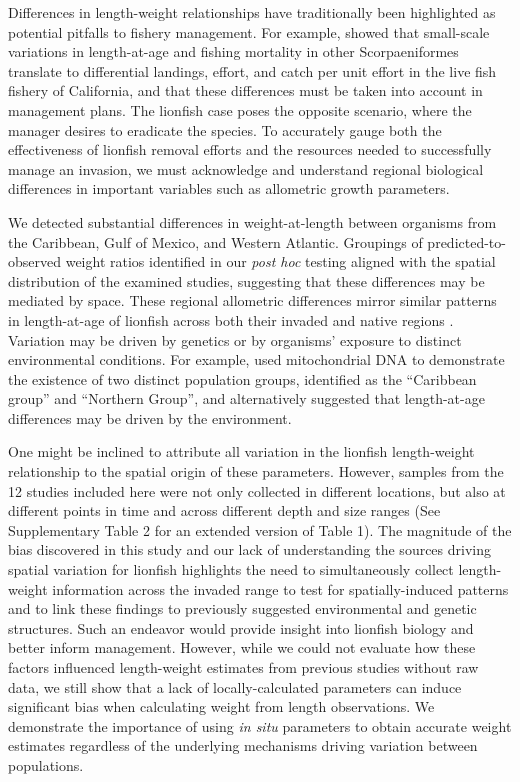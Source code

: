 \documentclass[fleqn,10pt,lineno]{wlpeerj} %
\begin{document}
Differences in length-weight relationships have traditionally been
highlighted as potential pitfalls to fishery management. For example,
\citet{wilson_2012} showed that small-scale variations in length-at-age
and fishing mortality in other Scorpaeniformes translate to differential
landings, effort, and catch per unit effort in the live fish fishery of
California, and that these differences must be taken into account in
management plans. The lionfish case poses the opposite scenario, where
the manager desires to eradicate the species. To accurately gauge both
the effectiveness of lionfish removal efforts and the resources needed
to successfully manage an invasion, we must acknowledge and understand
regional biological differences in important variables such as
allometric growth parameters.

We detected substantial differences in weight-at-length between
organisms from the Caribbean, Gulf of Mexico, and Western Atlantic.
Groupings of predicted-to-observed weight ratios identified in our
\emph{post hoc} testing aligned with the spatial distribution of the
examined studies, suggesting that these differences may be mediated by
space. These regional allometric differences mirror similar patterns in
length-at-age of lionfish across both their invaded and native regions
\citep{pusack_2016}. Variation may be driven by genetics or by
organisms' exposure to distinct environmental conditions. For example,
\citet{betancurr_2011} used mitochondrial DNA to demonstrate the
existence of two distinct population groups, identified as the
``Caribbean group'' and ``Northern Group'', and \citet{fogg_2015}
alternatively suggested that length-at-age differences may be driven by
the environment.

One might be inclined to attribute all variation in the lionfish
length-weight relationship to the spatial origin of these parameters.
However, samples from the 12 studies included here were not only
collected in different locations, but also at different points in time
and across different depth and size ranges (See Supplementary Table 2
for an extended version of Table 1). The magnitude of the bias
discovered in this study and our lack of understanding the sources
driving spatial variation for lionfish highlights the need to
simultaneously collect length-weight information across the invaded
range to test for spatially-induced patterns and to link these findings
to previously suggested environmental and genetic structures. Such an
endeavor would provide insight into lionfish biology and better inform
management. However, while we could not evaluate how these factors
influenced length-weight estimates from previous studies without raw
data, we still show that a lack of locally-calculated parameters can
induce significant bias when calculating weight from length
observations. We demonstrate the importance of using \emph{in situ}
parameters to obtain accurate weight estimates regardless of the
underlying mechanisms driving variation between populations.
\end{document}
